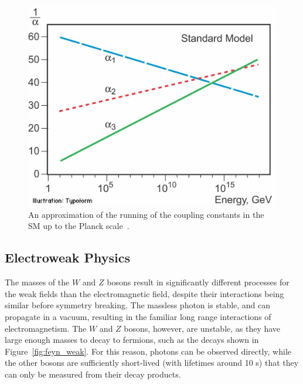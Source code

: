 \begin{figure}
\includegraphics[width=\fullfig]{figures/unification_sm.jpg}
\caption{An approximation of the running of the coupling constants in the \ac{SM} up to the Planck scale~\cite{unification_plot}.}
\label{fig:unification_sm}
\end{figure}


\subsection{Electroweak Physics}

The masses of the $W$ and $Z$ bosons result in significantly different processes for the weak fields than the electromagnetic field, despite their interactions being similar before symmetry breaking.
The massless photon is stable, and can propagate in a vacuum, resulting in the familiar long range interactions of electromagnetism.
The $W$ and $Z$ bosons, however, are unstable, as they have large enough masses to decay to fermions, such as the decays shown in Figure~\ref{fig:feyn_weak}.
For this reason, photons can be observed directly, while the other bosons are sufficiently short-lived (with lifetimes around 10 s) that they can only be measured from their decay products.

